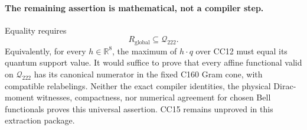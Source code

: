 \paragraph{The remaining assertion is mathematical, not a compiler step.}
Equality requires
\[
 \boxed{R_{\mathrm{global}}\subseteq\mathcal Q_{222}.}
\tag{CC15}
\]
Equivalently, for every $h\in\mathbb R^8$, the maximum of $h\cdot q$
over CC12 must equal its quantum support value.  It would suffice to
prove that every affine functional valid on $\mathcal Q_{222}$ has
its canonical numerator in the fixed C160 Gram cone, with compatible
relabelings.  Neither the exact compiler identities, the physical
Dirac-moment witnesses, compactness, nor numerical agreement for
chosen Bell functionals proves this universal assertion.  CC15
remains unproved in this extraction package.
